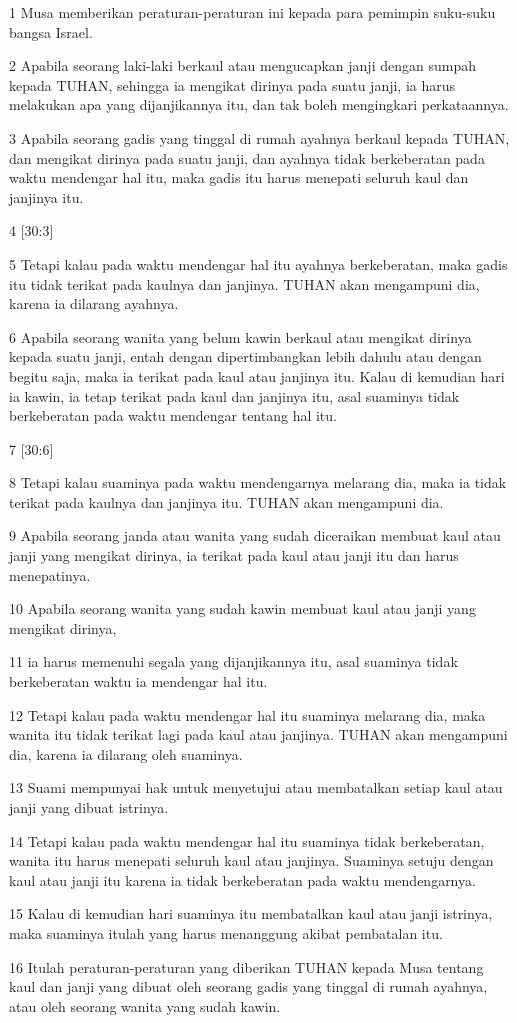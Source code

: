 \par 1 Musa memberikan peraturan-peraturan ini kepada para pemimpin suku-suku bangsa Israel.
\par 2 Apabila seorang laki-laki berkaul atau mengucapkan janji dengan sumpah kepada TUHAN, sehingga ia mengikat dirinya pada suatu janji, ia harus melakukan apa yang dijanjikannya itu, dan tak boleh mengingkari perkataannya.
\par 3 Apabila seorang gadis yang tinggal di rumah ayahnya berkaul kepada TUHAN, dan mengikat dirinya pada suatu janji, dan ayahnya tidak berkeberatan pada waktu mendengar hal itu, maka gadis itu harus menepati seluruh kaul dan janjinya itu.
\par 4 [30:3]
\par 5 Tetapi kalau pada waktu mendengar hal itu ayahnya berkeberatan, maka gadis itu tidak terikat pada kaulnya dan janjinya. TUHAN akan mengampuni dia, karena ia dilarang ayahnya.
\par 6 Apabila seorang wanita yang belum kawin berkaul atau mengikat dirinya kepada suatu janji, entah dengan dipertimbangkan lebih dahulu atau dengan begitu saja, maka ia terikat pada kaul atau janjinya itu. Kalau di kemudian hari ia kawin, ia tetap terikat pada kaul dan janjinya itu, asal suaminya tidak berkeberatan pada waktu mendengar tentang hal itu.
\par 7 [30:6]
\par 8 Tetapi kalau suaminya pada waktu mendengarnya melarang dia, maka ia tidak terikat pada kaulnya dan janjinya itu. TUHAN akan mengampuni dia.
\par 9 Apabila seorang janda atau wanita yang sudah diceraikan membuat kaul atau janji yang mengikat dirinya, ia terikat pada kaul atau janji itu dan harus menepatinya.
\par 10 Apabila seorang wanita yang sudah kawin membuat kaul atau janji yang mengikat dirinya,
\par 11 ia harus memenuhi segala yang dijanjikannya itu, asal suaminya tidak berkeberatan waktu ia mendengar hal itu.
\par 12 Tetapi kalau pada waktu mendengar hal itu suaminya melarang dia, maka wanita itu tidak terikat lagi pada kaul atau janjinya. TUHAN akan mengampuni dia, karena ia dilarang oleh suaminya.
\par 13 Suami mempunyai hak untuk menyetujui atau membatalkan setiap kaul atau janji yang dibuat istrinya.
\par 14 Tetapi kalau pada waktu mendengar hal itu suaminya tidak berkeberatan, wanita itu harus menepati seluruh kaul atau janjinya. Suaminya setuju dengan kaul atau janji itu karena ia tidak berkeberatan pada waktu mendengarnya.
\par 15 Kalau di kemudian hari suaminya itu membatalkan kaul atau janji istrinya, maka suaminya itulah yang harus menanggung akibat pembatalan itu.
\par 16 Itulah peraturan-peraturan yang diberikan TUHAN kepada Musa tentang kaul dan janji yang dibuat oleh seorang gadis yang tinggal di rumah ayahnya, atau oleh seorang wanita yang sudah kawin.

